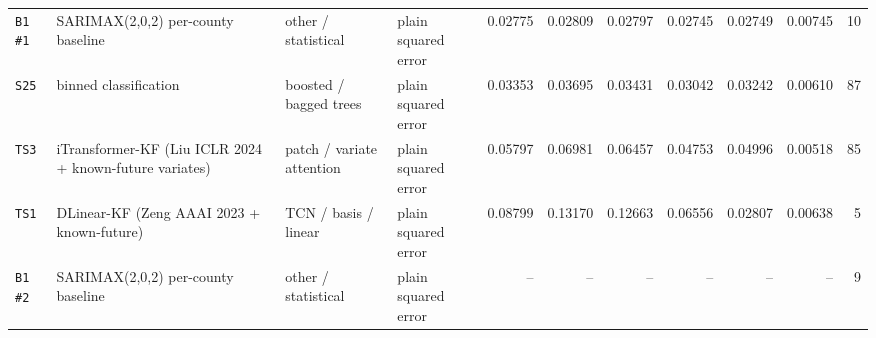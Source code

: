 \documentclass[9pt,landscape]{article}
\begin{document}
\begin{longtable}{@{}p{1.1cm}p{5.4cm}p{3.1cm}p{2.7cm}rrrrrrr@{}}
\texttt{B1 \#1} & SARIMAX(2,0,2) per-county baseline & other / statistical & plain squared error & 0.02775 & 0.02809 & 0.02797 & 0.02745 & 0.02749 & 0.00745 & 10 \\
\texttt{S25} & binned classification & boosted / bagged trees & plain squared error & 0.03353 & 0.03695 & 0.03431 & 0.03042 & 0.03242 & 0.00610 & 87 \\
\texttt{TS3} & iTransformer-KF (Liu ICLR 2024 + known-future variates) & patch / variate attention & plain squared error & 0.05797 & 0.06981 & 0.06457 & 0.04753 & 0.04996 & 0.00518 & 85 \\
\texttt{TS1} & DLinear-KF (Zeng AAAI 2023 + known-future) & TCN / basis / linear & plain squared error & 0.08799 & 0.13170 & 0.12663 & 0.06556 & 0.02807 & 0.00638 & 5 \\
\texttt{B1 \#2} & SARIMAX(2,0,2) per-county baseline & other / statistical & plain squared error & -- & -- & -- & -- & -- & -- & 9 \\
\bottomrule\end{longtable}
\end{document}

